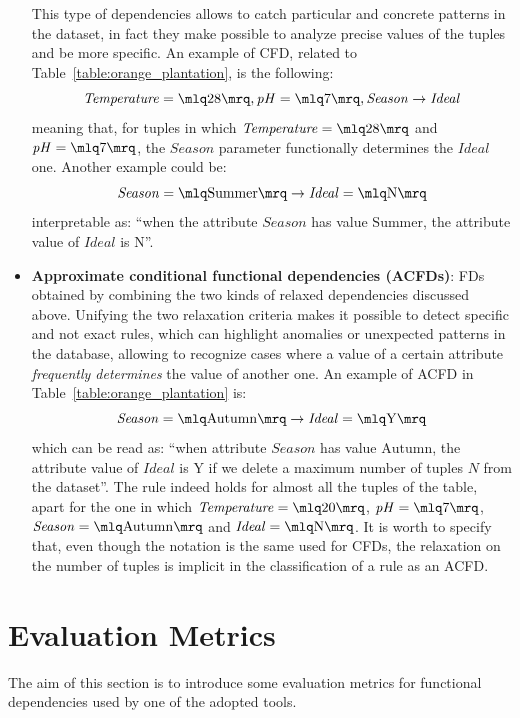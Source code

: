 \begin{itemize}
This type of dependencies allows to catch particular and concrete patterns in the dataset, in fact they make possible to analyze precise values of the tuples and be more specific. An example of CFD, related to Table~\ref{table:orange_plantation}, is the following: \[\mathit{Temperature} = \mlq 28 \mrq, \mathit{pH} = \mlq 7 \mrq, \mathit{Season} \rightarrow \mathit{Ideal}\] meaning that, for tuples in which \(\mathit{Temperature} = \mlq 28 \mrq\) and \(\mathit{pH} = \mlq 7 \mrq\), the \(\mathit{Season}\) parameter functionally determines the \(\mathit{Ideal}\) one. Another example could be: \[\mathit{Season} = \mlq \mathrm{Summer} \mrq \rightarrow \mathit{Ideal} = \mlq \mathrm{N} \mrq\] interpretable as: ``when the attribute \(\mathit{Season}\) has value \(\mathrm{Summer}\), the attribute value of \(\mathit{Ideal}\) is \(\mathrm{N}\)''.
\item \textbf{Approximate conditional functional dependencies (ACFDs)}: FDs obtained by combining the two kinds of relaxed dependencies discussed above. Unifying the two relaxation criteria makes it possible to detect specific and not exact rules, which can highlight anomalies or unexpected patterns in the database, allowing to recognize cases where a value of a certain attribute \textit{frequently determines} the value of another one. An example of ACFD in Table~\ref{table:orange_plantation} is: \[\mathit{Season} = \mlq \mathrm{Autumn} \mrq \rightarrow \mathit{Ideal} = \mlq \mathrm{Y} \mrq\] which can be read as: ``when attribute \(\mathit{Season}\) has value \(\mathrm{Autumn}\), the attribute value of \(\mathit{Ideal}\) is \(\mathrm{Y}\) if we delete a maximum number of tuples \(N\) from the dataset''. The rule indeed holds for almost all the tuples of the table, apart for the one in which \(\mathit{Temperature} = \mlq 20 \mrq\), \(\mathit{pH} = \mlq 7 \mrq\), \(\mathit{Season} = \mlq \mathrm{Autumn} \mrq\) and \(\mathit{Ideal} = \mlq \mathrm{N} \mrq\). It is worth to specify that, even though the notation is the same used for CFDs, the relaxation on the number of tuples is implicit in the classification of a rule as an ACFD.
\end{itemize}


\section{Evaluation Metrics}
\label{section:evaluation_metrics}
The aim of this section is to introduce some evaluation metrics for functional dependencies used by one of the adopted tools.

